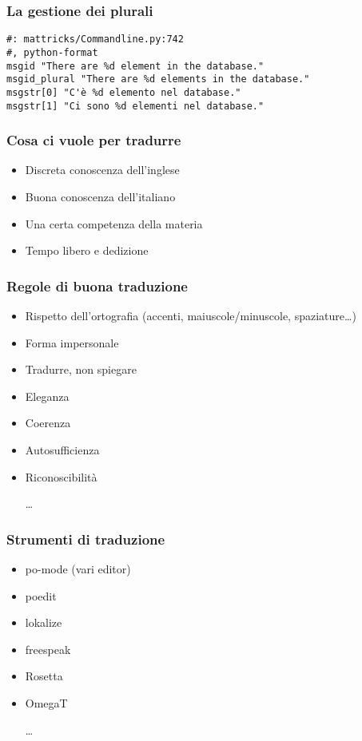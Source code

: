 \documentclass{beamer}
\begin{document}
\begin{frame}
\frametitle{La gestione dei plurali}
\begin{verbatim}
#: mattricks/Commandline.py:742
#, python-format
msgid "There are %d element in the database."
msgid_plural "There are %d elements in the database."
msgstr[0] "C'è %d elemento nel database."
msgstr[1] "Ci sono %d elementi nel database."
\end{verbatim}
\end{frame}

\begin{frame}\frametitle{Cosa ci vuole per tradurre}

\begin{itemize}
\item Discreta conoscenza dell'inglese
\item Buona conoscenza dell'italiano
\item Una certa competenza della materia
\item Tempo libero e dedizione
\end{itemize}
\end{frame}

\begin{frame}\frametitle{Regole di buona traduzione}
\begin{itemize}
\item Rispetto dell'ortografia (accenti, maiuscole/minuscole,
spaziature{\ldots})
\item Forma impersonale
\item Tradurre, non spiegare
\item Eleganza
\item Coerenza
\item Autosufficienza
\item Riconoscibilità
\item [{\ldots}]
\end{itemize}
\end{frame}

\begin{frame}\frametitle{Strumenti di traduzione}
\begin{itemize}
\item po-mode (vari editor)
\item poedit
\item lokalize
\item freespeak
\item Rosetta
\item OmegaT
\item [{\ldots}]
\end{itemize}
\end{frame}
\end{document}

